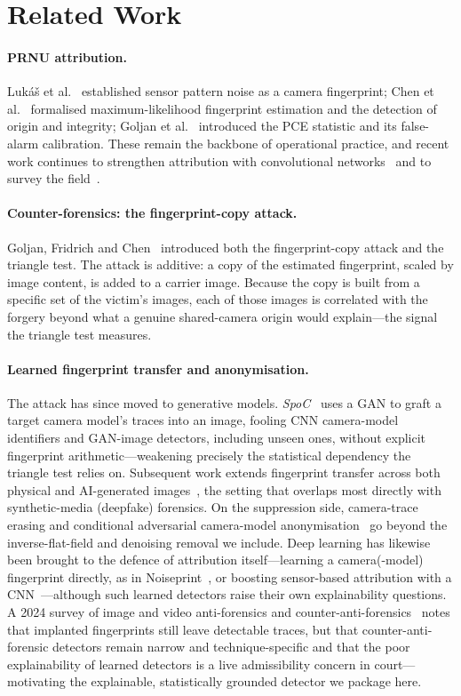 \documentclass[11pt]{article}
\begin{document}
\section{Related Work}
\paragraph{PRNU attribution.}
Luk\'a\v{s} et al.~\cite{lukas2006} established sensor pattern noise as a
camera fingerprint; Chen et al.~\cite{chen2008} formalised maximum-likelihood
fingerprint estimation and the detection of origin and integrity; Goljan
et al.~\cite{goljan2008} introduced the PCE statistic and its false-alarm
calibration. These remain the backbone of operational practice, and recent work
continues to strengthen attribution with convolutional
networks~\cite{robustcnn2024} and to survey the field~\cite{sensors2025survey}.

\paragraph{Counter-forensics: the fingerprint-copy attack.}
Goljan, Fridrich and Chen~\cite{goljan2011} introduced both the fingerprint-copy
attack and the triangle test. The attack is additive: a copy of the estimated
fingerprint, scaled by image content, is added to a carrier image. Because the
copy is built from a specific set of the victim's images, each of those images
is correlated with the forgery beyond what a genuine shared-camera origin would
explain---the signal the triangle test measures.

\paragraph{Learned fingerprint transfer and anonymisation.}
The attack has since moved to generative models. \emph{SpoC}~\cite{cozzolino2021spoc}
uses a GAN to graft a target camera model's traces into an image, fooling CNN
camera-model identifiers and GAN-image detectors, including unseen ones, without
explicit fingerprint arithmetic---weakening precisely the statistical dependency
the triangle test relies on. Subsequent work extends fingerprint transfer across
both physical and AI-generated images~\cite{prnutransfer2025}, the setting that
overlaps most directly with synthetic-media (deepfake) forensics. On the
suppression side, camera-trace erasing and conditional adversarial camera-model
anonymisation~\cite{andrews2020} go beyond the inverse-flat-field and denoising
removal we include. Deep learning has likewise been brought to the defence of
attribution itself---learning a camera(-model) fingerprint directly, as in
Noiseprint~\cite{noiseprint2020}, or boosting sensor-based attribution with a
CNN~\cite{spncnn2019}---although such learned detectors raise their own
explainability questions. A 2024 survey of image and video anti-forensics and
counter-anti-forensics~\cite{survey2024} notes that implanted fingerprints still
leave detectable traces, but that counter-anti-forensic detectors remain narrow
and technique-specific and that the poor explainability of learned detectors is
a live admissibility concern in court---motivating the explainable,
statistically grounded detector we package here.
\end{document}
